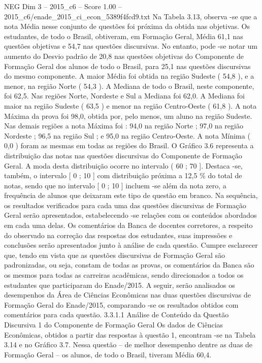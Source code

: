 \begin{textsample}{NEG Dim 3 – 2015\_c6 – Score 1.00 – 2015\_c6/enade\_2015\_ci\_econ\_5389f4fcd9.txt}
Na Tabela 3.13, observa -se que a nota Média nesse conjunto de questões foi próxima da obtida nas objetivas.
Os estudantes, de todo o Brasil, obtiveram, em Formação Geral, Média 61,1 nas questões objetivas e 54,7 nas questões discursivas.
No entanto, pode -se notar um aumento do Desvio padrão de 20,8 nas questões objetivas do Componente de Formação Geral dos alunos de todo o Brasil, para 25,1 nas questões discursivas do mesmo componente.
A maior Média foi obtida na região Sudeste ( 54,8 ), e a menor, na região Norte ( 54,3 ).
A Mediana de todo o Brasil, neste componente, foi 62,5.
Nas regiões Norte, Nordeste e Sul a Mediana foi 62,0.
A Mediana foi maior na região Sudeste ( 63,5 ) e menor na região Centro-Oeste ( 61,8 ).
A nota Máxima da prova foi 98,0, obtida por, pelo menos, um aluno na região Sudeste.
Nas demais regiões a nota Máxima foi : 94,0 na região Norte ; 97,0 na região Nordeste ; 96,5 na região Sul ; e 95,0 na região Centro-Oeste.
A nota Mínima ( 0,0 ) foram as mesmas em todas as regiões do Brasil.
O Gráfico 3.6 representa a distribuição das notas nas questões discursivas do Componente de Formação Geral.
A moda desta distribuição ocorre no intervalo ( 60 ; 70 ].
Destaca -se, também, o intervalo [ 0 ; 10 ] com distribuição próxima a 12,5 \% do total de notas, sendo que no intervalo [ 0 ; 10 ] incluem -se além da nota zero, a frequência de alunos que deixaram este tipo de questão em branco.
Na sequência, os resultados verificados para cada uma das questões discursivas de Formação Geral serão apresentados, estabelecendo -se relações com os conteúdos abordados em cada uma delas.
Os comentários da Banca de docentes corretores, a respeito do observado na correção das respostas dos estudantes, suas impressões e conclusões serão apresentados junto à análise de cada questão.
Cumpre esclarecer que, tendo em vista que as questões discursivas de Formação Geral são padronizadas, ou seja, constam de todas as provas, os comentários da Banca são os mesmos para todas as carreiras acadêmicas, sendo direcionados a todos os estudantes que participaram do Enade/2015.
A seguir, serão analisados os desempenhos da Área de Ciências Econômicas nas duas questões discursivas de Formação Geral do Enade/2015, comparando -se os resultados obtidos com comentários para cada questão. 3.3.1.1 Análise de Conteúdo da Questão Discursiva 1 do Componente de Formação Geral Os dados de Ciências Econômicas, obtidos a partir das respostas à questão 1, encontram -se na Tabela 3.14 e no Gráfico 3.7.
Nessa questão – de melhor desempenho dentre as duas de Formação Geral – os alunos, de todo o Brasil, tiveram Média 60,4.

\end{textsample}
